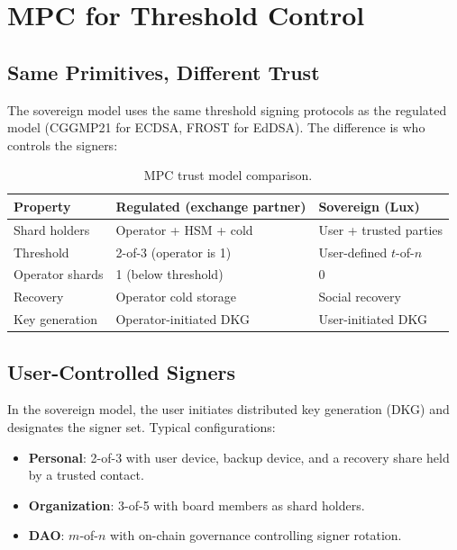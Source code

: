 \section{MPC for Threshold Control}

\label{sec:mpc}

\subsection{Same Primitives, Different Trust}

The sovereign model uses the same threshold signing protocols as the
regulated model (CGGMP21 for ECDSA, FROST for EdDSA).  The difference
is who controls the signers:

\begin{table}[h]
\centering
\small
\begin{tabular}{@{}lll@{}}
\toprule
\textbf{Property} & \textbf{Regulated (exchange partner)} & \textbf{Sovereign (Lux)} \\
\midrule
Shard holders    & Operator + HSM + cold   & User + trusted parties \\
Threshold        & 2-of-3 (operator is 1)  & User-defined $t$-of-$n$ \\
Operator shards  & 1 (below threshold)     & 0 \\
Recovery         & Operator cold storage   & Social recovery \\
Key generation   & Operator-initiated DKG  & User-initiated DKG \\
\bottomrule
\end{tabular}
\caption{MPC trust model comparison.}
\label{tab:mpc-comparison}
\end{table}

\subsection{User-Controlled Signers}

In the sovereign model, the user initiates distributed key generation (DKG)
and designates the signer set.  Typical configurations:
\begin{itemize}[nosep]
  \item \textbf{Personal}: 2-of-3 with user device, backup device, and a
        recovery share held by a trusted contact.
  \item \textbf{Organization}: 3-of-5 with board members as shard holders.
  \item \textbf{DAO}: $m$-of-$n$ with on-chain governance controlling
        signer rotation.
\end{itemize}

